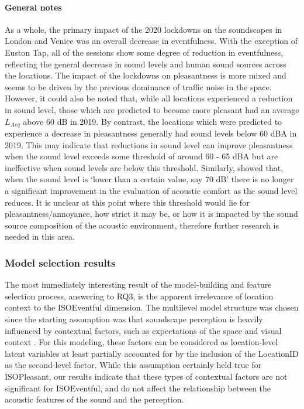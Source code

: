 \documentclass[
  authoryear,
  preprint,
  3p,
  onecolumn]{elsarticle}
\let\oldparagraph\paragraph
\renewcommand{\paragraph}[1]{\oldparagraph{#1}\mbox{}}
\begin{document}
\hypertarget{general-notes}{%
\paragraph{General notes}\label{general-notes}}

As a whole, the primary impact of the 2020 lockdowns on the soundscapes
in London and Venice was an overall decrease in eventfulness. With the
exception of Euston Tap, all of the sessions show some degree of
reduction in eventfulness, reflecting the general decrease in sound
levels and human sound sources across the locations. The impact of the
lockdowns on pleasantness is more mixed and seems to be driven by the
previous dominance of traffic noise in the space. However, it could also
be noted that, while all locations experienced a reduction in sound
level, those which are predicted to become more pleasant had an average
\(L_{Aeq}\) above 60 dB in 2019. By contrast, the locations which were
predicted to experience a decrease in pleasantness generally had sound
levels below 60 dBA in 2019. This may indicate that reductions in sound
level can improve pleasantness when the sound level exceeds some
threshold of around 60 - 65 dBA but are ineffective when sound levels
are below this threshold. Similarly, \citet{Yang2005Acoustic} showed
that, when the sound level is `lower than a certain value, say 70 dB'
there is no longer a significant improvement in the evaluation of
acoustic comfort as the sound level reduces. It is unclear at this point
where this threshold would lie for pleasantness/annoyance, how strict it
may be, or how it is impacted by the sound source composition of the
acoustic environment, therefore further research is needed in this area.

\hypertarget{model-selection-results}{%
\subsubsection{Model selection results}\label{model-selection-results}}

The most immediately interesting result of the model-building and
feature selection process, answering to RQ3, is the apparent irrelevance
of location context to the ISOEventful dimension. The multilevel model
structure was chosen since the starting assumption was that soundscape
perception is heavily influenced by contextual factors, such as
expectations of the space and visual context \citep{Ricciardi2015Sound}.
For this modeling, these factors can be considered as location-level
latent variables at least partially accounted for by the inclusion of
the LocationID as the second-level factor. While this assumption
certainly held true for ISOPleasant, our results indicate that these
types of contextual factors are not significant for ISOEventful, and do
not affect the relationship between the acoustic features of the sound
and the perception.
\end{document}
